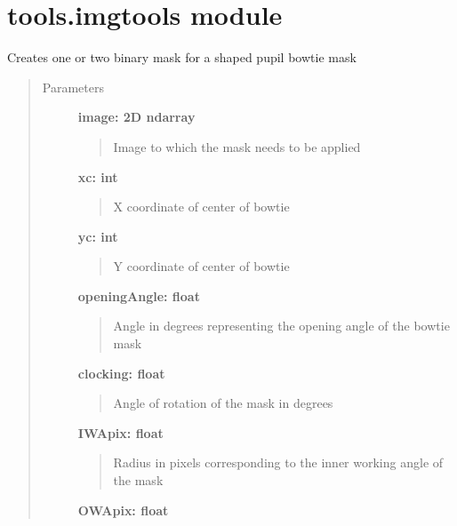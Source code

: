 \documentclass[letterpaper,10pt,english]{sphinxmanual}
\begin{document}
\section{tools.imgtools module}
\label{tools:module-tools.imgtools}\label{tools:tools-imgtools-module}

\begin{fulllineitems}
\label{tools:tools.imgtools.bowtie}
Creates one or two binary mask for a shaped pupil bowtie mask
\begin{quote}\begin{description}
\item[{Parameters}] \leavevmode
\textbf{image: 2D ndarray}
\begin{quote}

Image to which the mask needs to be applied
\end{quote}

\textbf{xc: int}
\begin{quote}

X coordinate of center of bowtie
\end{quote}

\textbf{yc: int}
\begin{quote}

Y coordinate of center of bowtie
\end{quote}

\textbf{openingAngle: float}
\begin{quote}

Angle in degrees representing the opening angle of the bowtie mask
\end{quote}

\textbf{clocking: float}
\begin{quote}

Angle of rotation of the mask in degrees
\end{quote}

\textbf{IWApix: float}
\begin{quote}

Radius in pixels corresponding to the inner working angle of the mask
\end{quote}

\textbf{OWApix: float}
\begin{quote}


\end{quote}
\end{description}
\end{quote}
\end{fulllineitems}
\end{document}
